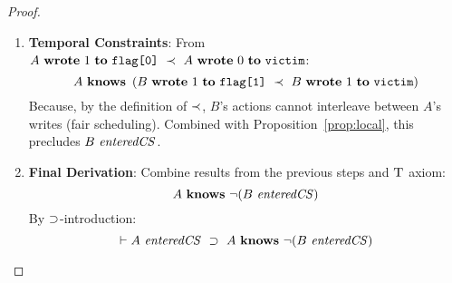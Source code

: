 \begin{proof}
\begin{enumerate}
\item \textbf{Temporal Constraints}:
From \( A\ \Writes\ 1\ \To\ \FlagZero\ \HappensBefore\ A\ \Writes\ 0\ \To\ \Victim \):
\[
A\ \Knows\ \left( B\ \Writes\ 1\ \To\ \FlagOne\ \HappensBefore\ B\ \Writes\ 1\ \To\ \Victim \right)
\]
Because, by the definition of $\prec$, $B$'s actions cannot interleave between $A$'s writes (fair scheduling). Combined with Proposition~\ref{prop:local}, this precludes \( B\ \mathit{enteredCS} \).

\item \textbf{Final Derivation}:
Combine results from the previous steps and \(\textsc{T}\) axiom:
\[
A\ \mathbf{knows}\ \neg(B\ \mathit{enteredCS})
\]
By \(\supset\)-introduction:
\[
\vdash A\ \EntersCS\ \Implies\ A\ \Knows\ \neg(B\ \EntersCS)
\]
\end{enumerate}
\end{proof}





